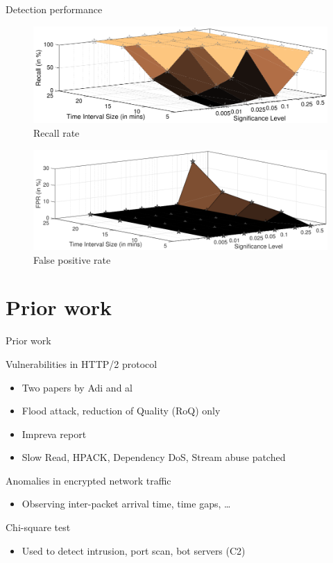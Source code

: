 \documentclass{beamer}
\begin{document}
\begin{frame}{Detection performance}
  \begin{figure}[t]
    \includegraphics[scale=0.27]{images/recallRate.png}
    \caption{Recall rate}
  \end{figure}
	\vspace{-1.5em}
  \begin{figure}[t]
    \includegraphics[scale=0.27]{images/falsePositiveRate.png}
    \caption{False positive rate}
  \end{figure}
\end{frame}

\section{Prior work}
\begin{frame}{Prior work}
	\begin{alertblock}{Vulnerabilities in HTTP/2 protocol}
	\begin{itemize}
		\item Two papers by Adi and al~\cite{Adi:2015} \cite{Adi:2016}
		\item Flood attack, reduction of Quality (RoQ) only
		\item Impreva report
		\item Slow Read, HPACK, Dependency DoS, Stream abuse \Rightarrow patched
	\end{itemize}
	\end{alertblock}
	\begin{alertblock}{Anomalies in encrypted network traffic}
	\begin{itemize}
		\item Observing inter-packet arrival time, time gaps, \ldots
	\end{itemize}
	\end{alertblock}
	\begin{alertblock}{Chi-square test}
	\begin{itemize}
		\item Used to detect intrusion, port scan, bot servers (C2)
	\end{itemize}
	\end{alertblock}
\end{frame}
\end{document}
